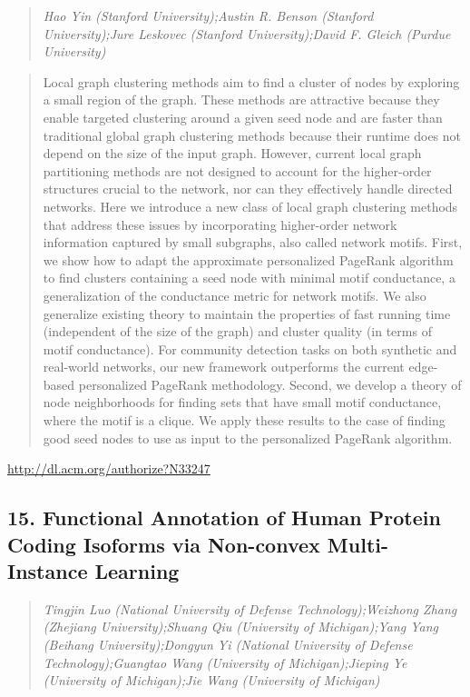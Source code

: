 \documentclass{article}
\begin{document}
\begin{quote}
\footnotesize{\textit{Hao Yin (Stanford University);Austin R. Benson (Stanford University);Jure Leskovec (Stanford University);David F. Gleich (Purdue University)}}

\end{quote}

\begin{quote}
Local graph clustering methods aim to find a cluster of nodes by exploring a small region of the graph. These methods are attractive because they enable targeted clustering around a given seed node and are faster than traditional global graph clustering methods because their runtime does not depend on the size of the input graph. However, current local graph partitioning methods are not designed to account for the higher-order structures crucial to the network, nor can they effectively handle directed networks. Here we introduce a new class of local graph clustering methods that address these issues by incorporating higher-order network information captured by small subgraphs, also called network motifs. First, we show how to adapt the approximate personalized PageRank algorithm to find clusters containing a seed node with minimal motif conductance, a generalization of the conductance metric for network motifs. We also generalize existing theory to maintain the properties of fast running time (independent of the size of the graph) and cluster quality (in terms of motif conductance). For community detection tasks on both synthetic and real-world networks, our new framework outperforms the current edge-based personalized PageRank methodology. Second, we develop a theory of node neighborhoods for finding sets that have small motif conductance, where the motif is a clique. We apply these results to the case of finding good seed nodes to use as input to the personalized PageRank algorithm.
\end{quote}

\href{http://dl.acm.org/authorize?N33247}{http://dl.acm.org/authorize?N33247}

\subsection{15. Functional Annotation of Human Protein Coding Isoforms via Non-convex Multi-Instance Learning}

\begin{quote}
\footnotesize{\textit{Tingjin Luo (National University of Defense Technology);Weizhong Zhang (Zhejiang University);Shuang Qiu (University of Michigan);Yang Yang (Beihang University);Dongyun Yi (National University of Defense Technology);Guangtao Wang (University of Michigan);Jieping Ye (University of Michigan);Jie Wang (University of Michigan)}}

\end{quote}
\end{document}

